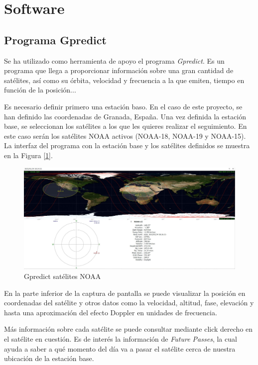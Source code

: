 \documentclass[a4paper,openright,12pt]{article}
\begin{document}
\section{Software}

	\subsection{Programa Gpredict}
	Se ha utilizado como herramienta de apoyo el programa \textit{Gpredict}. Es un programa que llega a proporcionar información sobre una gran cantidad de satélites, así como su órbita, velocidad y frecuencia a la que emiten, tiempo en función de la posición...
	
	Es necesario definir primero una estación baso. En el caso de este proyecto, se han definido las coordenadas de Granada, España. Una vez definida la estación base, se seleccionan los satélites a los que les quieres realizar el seguimiento. En este caso serán los satélites NOAA activos (NOAA-18, NOAA-19 y NOAA-15). La interfaz del programa con la estación base y los satélites definidos se muestra en la Figura [\ref{gpredict}].
	
	\begin{figure}[H]
 \centering
 \includegraphics[width = 1 \linewidth]{imagenes/Gpredict_NOAA.JPG}
 \caption{Gpredict satélites NOAA}
 \label{gpredict}
 \end{figure}
 
 En la parte inferior de la captura de pantalla se puede visualizar la posición en coordenadas del satélite y otros datos como la velocidad, altitud, fase, elevación y hasta una aproximación del efecto Doppler en unidades de frecuencia.
 
 Más información sobre cada satélite se puede consultar mediante click derecho en el satélite en cuestión. Es de interés la información de \textit{Future Passes}, la cual ayuda a saber a qué momento del día va a pasar el satélite cerca de nuestra ubicación de la estación base.
 
\end{document}
